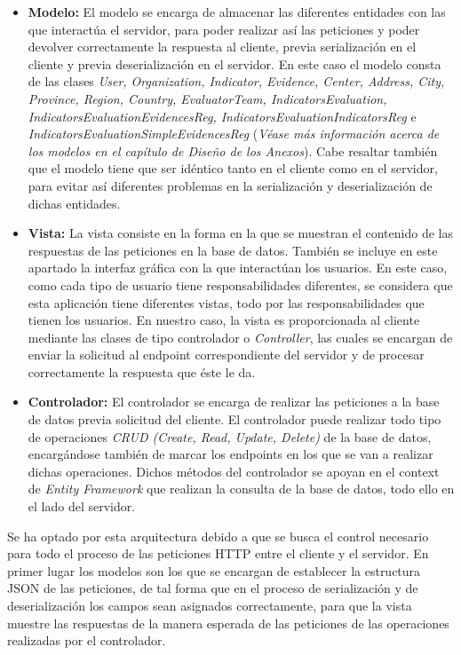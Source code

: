 \begin{itemize}
    \item \textbf{Modelo: }El modelo se encarga de almacenar las diferentes
    entidades con las que interactúa el servidor, para poder realizar así las
    peticiones y poder devolver correctamente la respuesta al cliente, previa
    serialización en el cliente y previa deserialización en el servidor. En este
    caso el modelo consta de las clases \textit{User, Organization, Indicator,
    Evidence, Center, Address, City, Province, Region, Country, EvaluatorTeam, IndicatorsEvaluation, IndicatorsEvaluationEvidencesReg, IndicatorsEvaluationIndicatorsReg} e
    \textit{IndicatorsEvaluationSimpleEvidencesReg} (\textit{Véase más información acerca de
    los modelos en el capítulo de Diseño de los Anexos}). Cabe resaltar también
    que el modelo tiene que ser idéntico tanto en el cliente como en el
    servidor, para evitar así diferentes problemas en la serialización y
    deserialización de dichas entidades. 
    \item \textbf{Vista: }La vista consiste en la forma en la que se muestran el
    contenido de las respuestas de las peticiones en la base de datos. También
    se incluye en este apartado la interfaz gráfica con la que interactúan los
    usuarios. En este caso, como cada tipo de usuario tiene responsabilidades
    diferentes, se considera que esta aplicación tiene diferentes vistas, todo
    por las responsabilidades que tienen los usuarios. En nuestro caso, la vista
    es proporcionada al cliente mediante las clases de tipo controlador o \textit{Controller},
    las cuales se encargan de enviar la solicitud al endpoint correspondiente
    del servidor y de procesar correctamente la respuesta que éste le da.
    \item \textbf{Controlador: }El controlador se encarga de realizar las
    peticiones a la base de datos previa solicitud del cliente. El controlador
    puede realizar todo tipo de operaciones \textit{CRUD (Create, Read, Update,
    Delete)} de la base de datos, encargándose también de marcar los endpoints
    en los que se van a realizar dichas operaciones. Dichos métodos del
    controlador se apoyan en el context de \textit{Entity Framework} que realizan la consulta de
    la base de datos, todo ello en el lado del servidor.
\end{itemize}

Se ha optado por esta arquitectura debido a que se busca el control necesario
para todo el proceso de las peticiones HTTP entre el cliente y el servidor. En
primer lugar los modelos son los que se encargan de establecer la estructura
JSON de las peticiones, de tal forma que en el proceso de serialización y de
deserialización los campos sean asignados correctamente, para que la vista
muestre las respuestas de la manera esperada de las peticiones de las
operaciones realizadas por el controlador.

